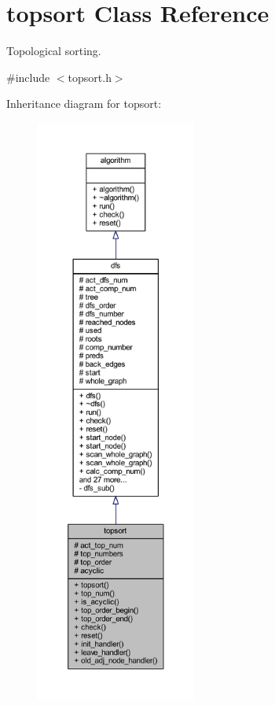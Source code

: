 \hypertarget{classtopsort}{}\section{topsort Class Reference}
\label{classtopsort}


Topological sorting.  




{\ttfamily \#include $<$topsort.\+h$>$}



Inheritance diagram for topsort\+:\nopagebreak
\begin{figure}[H]
\begin{center}
\leavevmode
\includegraphics[height=550pt]{classtopsort__inherit__graph}
\end{center}
\end{figure}


